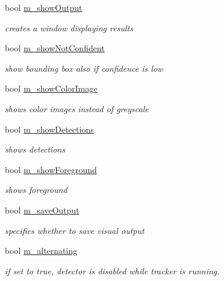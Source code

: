 \begin{DoxyCompactItemize}
bool \hyperlink{classtld_1_1_settings_abce1f9678efba0511db88545d97bb535}{m\_\-showOutput}
\begin{DoxyCompactList}\small\item\em creates a window displaying results \item\end{DoxyCompactList}\item 
bool \hyperlink{classtld_1_1_settings_acd69b3d8edc2fe3a05bb763dfd17b30b}{m\_\-showNotConfident}
\begin{DoxyCompactList}\small\item\em show bounding box also if confidence is low \item\end{DoxyCompactList}\item 
bool \hyperlink{classtld_1_1_settings_a495b2aba7d0c9ec5fb914ab04b6d42cf}{m\_\-showColorImage}
\begin{DoxyCompactList}\small\item\em shows color images instead of greyscale \item\end{DoxyCompactList}\item 
bool \hyperlink{classtld_1_1_settings_abcc93dd632486081ba14ebfaaaecd392}{m\_\-showDetections}
\begin{DoxyCompactList}\small\item\em shows detections \item\end{DoxyCompactList}\item 
bool \hyperlink{classtld_1_1_settings_ab2398d08ccb9bab01c3240651d07f8c3}{m\_\-showForeground}
\begin{DoxyCompactList}\small\item\em shows foreground \item\end{DoxyCompactList}\item 
bool \hyperlink{classtld_1_1_settings_a46de5897c9f1bc410c0f44f459181e05}{m\_\-saveOutput}
\begin{DoxyCompactList}\small\item\em specifies whether to save visual output \item\end{DoxyCompactList}\item 
bool \hyperlink{classtld_1_1_settings_ae4a5b3fb575a1a49823f8305f3aefded}{m\_\-alternating}
\begin{DoxyCompactList}\small\item\em if set to true, detector is disabled while tracker is running. \item\end{DoxyCompactList}\item 

\end{DoxyCompactItemize}
